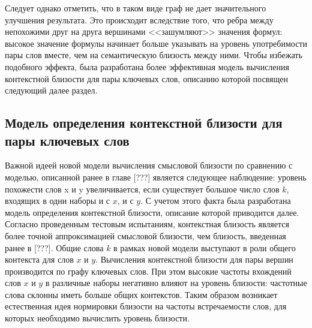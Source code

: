 Следует однако отметить, что в таком виде граф не дает значительного улучшения результата. Это происходит вследствие того, что ребра между непохожими друг на друга вершинами <<зашумляют>> значения формул:   высокое значение формулы начинает больше указывать на уровень употребимости пары слов вместе, чем на семантическую близость между ними. Чтобы избежать подобного эффекта, была разработана более эффективная модель вычисления контекстной близости для пары ключевых слов, описанию которой посвящен следующий далее раздел.


\subsection{Модель определения контекстной близости для пары ключевых слов} %
Важной идеей новой модели вычисления смысловой близости по сравнению с моделью, описанной ранее в главе [???] является следующее наблюдение: уровень похожести слов x и y увеличивается, если существует большое число слов $k$, входящих в одни наборы и с $x$, и с $y$. С учетом этого факта была разработана модель определения контекстной близости, описание которой приводится далее. Согласно проведенным тестовым испытаниям, контекстная близость является более точной аппроксимацией смысловой близости, чем близость, введенная ранее в [???]. Общие слова $k$ в рамках новой модели выступают в роли общего контекста для слов $x$ и $y$. Вычисления контекстной близости для пары вершин производится по графу ключевых слов. При этом высокие частоты вхождений слов $x$ и $y$ в различные наборы негативно влияют на уровень близости: частотные слова склонны иметь больше общих контекстов. Таким образом возникает естественная идея нормировки близости на частоты встречаемости слов, для которых необходимо вычислить уровень близости. 

